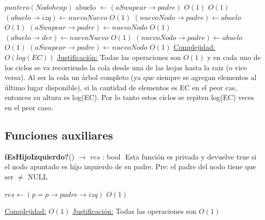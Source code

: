 \begin{Algoritmos}
\begin{algorithmic}[1]
					\Else
					\State $puntero(Nodoheap)$ abuelo $\gets (aSwapear \rightarrow padre)$ \Comment $O(1)$
						 \Comment $O(1)$
							\State $(abuelo \rightarrow izq) \gets nuevoNuevo$ \Comment $O(1)$
							\State $(nuevoNodo \rightarrow padre) \gets abuelo$ \Comment $O(1)$
							\State $(aSwapear \rightarrow padre) \gets nuevoNodo$ \Comment $O(1)$
						\Else
							\State $(abuelo \rightarrow der) \gets nuevoNuevo$ \Comment $O(1)$
							\State $(nuevoNodo \rightarrow padre) \gets abuelo$ \Comment $O(1)$
							\State $(aSwapear \rightarrow padre) \gets nuevoNodo$ \Comment $O(1)$
						\EndIf
					\EndIf
					\EndIf
				\EndIf
			\EndIf
			\medskip
			\Statex \underline{Complejidad:} $O(log(EC))$
			\Statex \underline{Justificaci\'on:} Todas las operaciones son $O(1)$ y en cada uno de los ciclos se va recorriendo la cola desde una de las hojas hasta la raiz (o vice versa). Al ser la cola un \'arbol completo (ya que siempre se agregan elementos al \'ultimo lugar disponible), si la cantidad de elementos es EC en el peor cas, entonces su altura es log(EC). Por lo tanto estos ciclos se repiten log(EC) veces en el peor caso.
    	\end{algorithmic}
   \subsection{Funciones auxiliares}
\begin{algorithm}[H]{\textbf{iEsHijoIzquierdo?}() $\to$ $res$ : bool} $ $\newline
\Comment Esta funci\'on es privada y devuelve true si el nodo apuntado es hijo izquierdo de su padre. Pre: el padre del nodo tiene que ser $\not=$ NULL
    	\begin{algorithmic}[1] 
			 \State $res \gets  (p = p \rightarrow padre \rightarrow izq) $ \Comment $O(1)$

			\medskip
			\Statex \underline{Complejidad:} $O(1)$
			\Statex \underline{Justificaci\'on:} Todas las operaciones son $O(1)$
    	\end{algorithmic}   	
\end{algorithm}


\end{Algoritmos}
